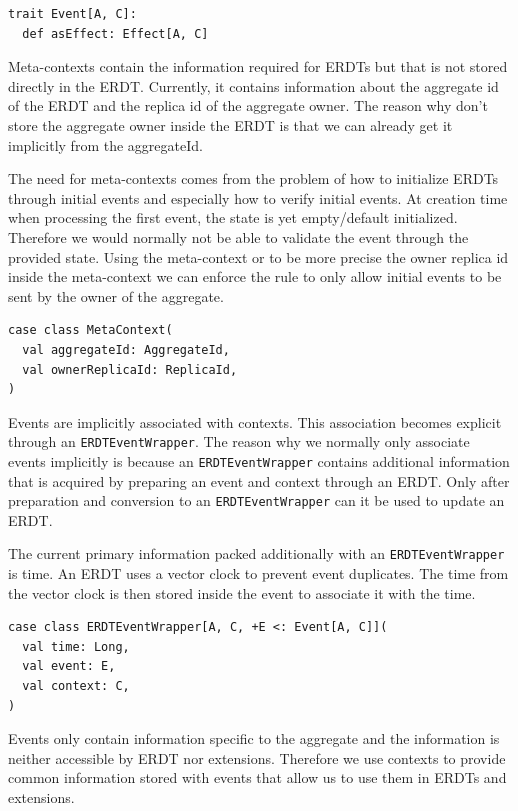 \documentclass[
	english,
	ruledheaders=section,   %
	class=report,		    %
	thesis={type=bachelor}, %
	accentcolor=9c,			%
	custommargins=true,    %
	marginpar=false,        %
	parskip=half-,          %
	fontsize=11pt,          %
]{tudapub}
\begin{document}
\begin{lstlisting}
trait Event[A, C]:
  def asEffect: Effect[A, C]
\end{lstlisting}

Meta-contexts contain the information required for ERDTs but that is not stored directly in the ERDT. Currently, it contains information about the aggregate id of the ERDT and the replica id of the aggregate owner. The reason why don't store the aggregate owner inside the ERDT is that we can already get it implicitly from the aggregateId.

The need for meta-contexts comes from the problem of how to initialize ERDTs through initial events and especially how to verify initial events. At creation time when processing the first event, the state is yet empty/default initialized. Therefore we would normally not be able to validate the event through the provided state. Using the meta-context or to be more precise the owner replica id inside the meta-context we can enforce the rule to only allow initial events to be sent by the owner of the aggregate.

\begin{lstlisting}
case class MetaContext(
  val aggregateId: AggregateId,
  val ownerReplicaId: ReplicaId,
)
\end{lstlisting}

Events are implicitly associated with contexts. This association becomes explicit through an \texttt{ERDTEventWrapper}. The reason why we normally only associate events implicitly is because an \texttt{ERDTEventWrapper} contains additional information that is acquired by preparing an event and context through an ERDT. Only after preparation and conversion to an \texttt{ERDTEventWrapper} can it be used to update an ERDT. 

The current primary information packed additionally with an \texttt{ERDTEventWrapper} is time. An ERDT uses a vector clock to prevent event duplicates. The time from the vector clock is then stored inside the event to associate it with the time.

\begin{lstlisting}
case class ERDTEventWrapper[A, C, +E <: Event[A, C]](
  val time: Long,
  val event: E,
  val context: C,
)
\end{lstlisting}

Events only contain information specific to the aggregate and the information is neither accessible by ERDT nor extensions. Therefore we use contexts to provide common information stored with events that allow us to use them in ERDTs and extensions. 
\end{document}
